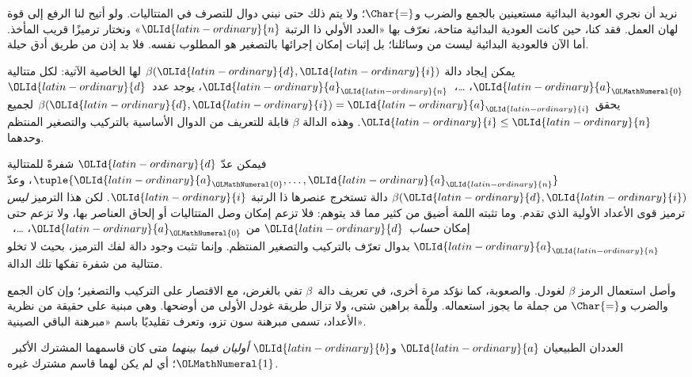 \documentclass[../../../include/open-logic-section]{subfiles}
\begin{document}

نريد أن نجري العودية البدائية مستعينين بالجمع والضرب
و$\Char{=}$؛ ولا يتم ذلك حتى نبني دوال للتصرف في المتتاليات.
ولو أتيح لنا الرفع إلى قوة لهان العمل. فقد كنا، حين كانت العودية البدائية
متاحة، نعرّف بها «العدد الأولي ذا الرتبة ${\OLId{latin-ordinary}{n}}$» ونختار ترميزًا قريب المأخذ.
أما الآن فالعودية البدائية ليست من وسائلنا؛ بل إثبات إمكان إجرائها
بالتصغير هو المطلوب نفسه. فلا بد إذن من طريق أدق حيلة.

\begin{lem}
يمكن إيجاد دالة $\beta({\OLId{latin-ordinary}{d}},{\OLId{latin-ordinary}{i}})$ لها الخاصية الآتية: لكل متتالية ${\OLId{latin-ordinary}{a}}_{\OLMathNumeral{0}}$، \dots،~${\OLId{latin-ordinary}{a}}_{\OLId{latin-ordinary}{n}}$،
يوجد عدد~${\OLId{latin-ordinary}{d}}$ يحقق $\beta({\OLId{latin-ordinary}{d}},{\OLId{latin-ordinary}{i}})={\OLId{latin-ordinary}{a}}_{\OLId{latin-ordinary}{i}}$ لجميع ${\OLId{latin-ordinary}{i}}\le {\OLId{latin-ordinary}{n}}$.
وهذه الدالة $\beta$ قابلة للتعريف من الدوال الأساسية بالتركيب والتصغير
المنتظم وحدهما.
\end{lem}

فيمكن عدّ ${\OLId{latin-ordinary}{d}}$ شفرةً للمتتالية $\tuple{{\OLId{latin-ordinary}{a}}_{\OLMathNumeral{0}},\dots,{\OLId{latin-ordinary}{a}}_{\OLId{latin-ordinary}{n}}}$، وعدّ
$\beta({\OLId{latin-ordinary}{d}},{\OLId{latin-ordinary}{i}})$ دالة تستخرج عنصرها ذا الرتبة ${\OLId{latin-ordinary}{i}}$. لكن هذا الترميز
\emph{ليس} ترميز قوى الأعداد الأولية الذي تقدم. وما تثبته اللمة أضيق من
كثير مما قد يتوهم: فلا تزعم إمكان وصل المتتاليات أو إلحاق العناصر بها،
ولا تزعم حتى إمكان \emph{حساب}~${\OLId{latin-ordinary}{d}}$ من ${\OLId{latin-ordinary}{a}}_{\OLMathNumeral{0}}$، \dots،~${\OLId{latin-ordinary}{a}}_{\OLId{latin-ordinary}{n}}$
بدوال تعرّف بالتركيب والتصغير المنتظم. وإنما تثبت وجود دالة لفك الترميز،
بحيث لا تخلو متتالية من شفرة تفكها تلك الدالة.

وأصل استعمال الرمز $\beta$ لغودل. والصعوبة، كما نؤكد مرة أخرى، في
تعريف دالة~$\beta$ تفي بالغرض، مع الاقتصار على التركيب والتصغير؛ وإن كان
الجمع والضرب و$\Char{=}$ من جملة ما يجوز استعماله. وللّمة براهين شتى،
ولا تزال طريقة غودل الأولى من أوضحها. وهي مبنية على حقيقة من نظرية الأعداد،
تسمى مبرهنة سون تزو، وتعرف تقليديًا باسم «مبرهنة الباقي الصينية».

\begin{defn}
العددان الطبيعيان ${\OLId{latin-ordinary}{a}}$ و${\OLId{latin-ordinary}{b}}$ \emph{أوليان فيما بينهما} متى كان
قاسمهما المشترك الأكبر~${\OLMathNumeral{1}}$؛ أي لم يكن لهما قاسم مشترك غيره.
\end{defn}
\end{document}
